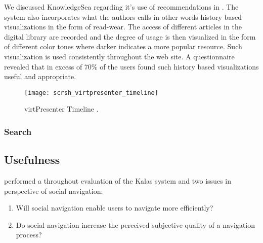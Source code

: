 We discussed KnowledgeSea regarding it's use of recommendations in
.
The system also incorporates what the authors calls
\citep[p.~12]{brusilovsky05}\dash{}in other words history based visualizations
in the form of read-wear. The access of different articles in the digital
library are recorded and the degree of usage is then visualized in the form of
different color tones where darker indicates a more popular resource. Such
visualization is used consistently throughout the web site. A questionnaire
revealed that in excess of 70\% \citeyearpar[p.15]{brusilovsky05} of the users
found such history based visualizations useful and appropriate.

\begin{figure}
  \centering
  \texttt{[image: scrsh\_virtpresenter\_timeline]}
  \caption[virtPresenter Timeline]{
    virtPresenter Timeline \citep[p.~43]{mertens06}.
  }
  \label{figure:scrsh.virtpresenter.timeline}
\end{figure}


\subsubsection{Search}

\subsection{Usefulness}

\citet{svensson05} performed a throughout evaluation of the Kalas system and
two issues in perspective of social navigation:

\begin{enumerate}
  \item Will social navigation enable users to navigate more efficiently?
  \item Do social navigation increase the perceived subjective quality of
    a navigation process?
\end{enumerate}

